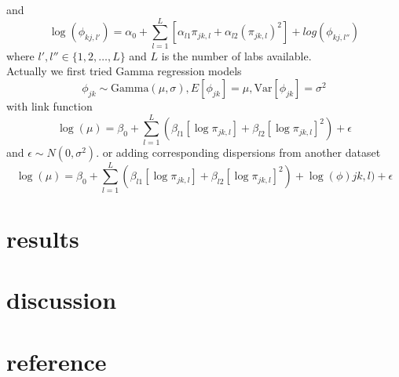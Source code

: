 \documentclass[paper=a4, fontsize=12.5pt]{scrartcl} %
\numberwithin{equation}{section} %
\numberwithin{figure}{section} %
\numberwithin{table}{section} %
\begin{document}
   	and 
   	\[\log(\phi_{kj,l'})= \alpha_0 + \sum_{l=1}^L[\alpha_{l1}\pi_{jk, l} + \alpha_{l2}(\pi_{jk, l})^2] + log(\phi_{kj, l''})   	\]
   	where $l', l''\in \{1, 2, \ldots, L\}$ and $L$ is the number of labs available.\\
	Actually we first tried Gamma regression models
	\[\phi_{jk} \sim \text{Gamma}(\mu, \sigma), E[\phi_{jk}]=\mu,  \text{Var}[\phi_{jk}] = \sigma^2\]
	with link function 
	\[\log(\mu)=\beta_0 +\sum_{l=1}^L(\beta_{l1}[\log\pi_{jk, l}] + \beta_{l2}[\log\pi_{jk, l}]^2) + \epsilon\]
	and $\epsilon\sim N(0, \sigma^2)$.
	or adding corresponding dispersions from another dataset
	\[\log(\mu)=\beta_0 +\sum_{l=1}^L(\beta_{l1}[\log\pi_{jk, l}] + \beta_{l2}[\log\pi_{jk, l}]^2) + \log(\phi){jk, l}) + \epsilon\]
  \section{results}
  \section{discussion}
  \section{reference}
\end{document}

